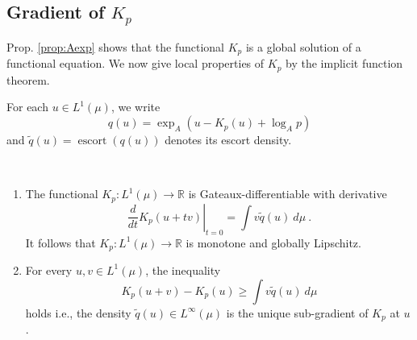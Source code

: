 \documentclass[graybox]{svmult}
\newcommand{\escortof}[1]{\operatorname{escort}\left(#1\right)}
\begin{document}
\subsection{Gradient of $K_p$}
Prop. \ref{prop:Aexp} shows that the functional $K_{p}$ is a global solution
of a functional equation. We now give local properties of $K_{p}$ by the
implicit function theorem.

For each $u\in L^{1}(\mu )$, we write 
\begin{equation*}
q(u)=\exp _{A}(u-K_{p}(u)+\log _{A}p)
\end{equation*}
and $\widetilde{q}(u) = \escortof{q(u)}$ denotes its escort density.

\begin{proposition}
\ \label{prop:subgradient}
%
\begin{enumerate}
\item \label{item:subgradient1} The functional $K_{p}\colon L^{1}(\mu )\rightarrow \mathbb{R}$ is
Gateaux-differentiable with derivative 
\begin{equation*}
\left. \frac{d}{dt}K_{p}(u+tv)\right\vert _{t=0}=\int v\widetilde{q}(u)\
d\mu \ .
\end{equation*}
It follows that $K_{p}\colon L^{1}(\mu )\rightarrow \mathbb{R}$ is monotone and globally Lipschitz.
\item For every $u,v\in L^{1}(\mu )$, the inequality 
\begin{equation*}
K_{p}(u+v)-K_{p}(u)\geq \int v\widetilde{q}(u)\ d\mu
\end{equation*}
holds i.e., the density $\widetilde{q}(u)\in L^{\infty }(\mu )$ is the
unique sub-gradient of $K_{p}$ at $u$.
\end{enumerate}
\end{proposition}
%
\end{document}
